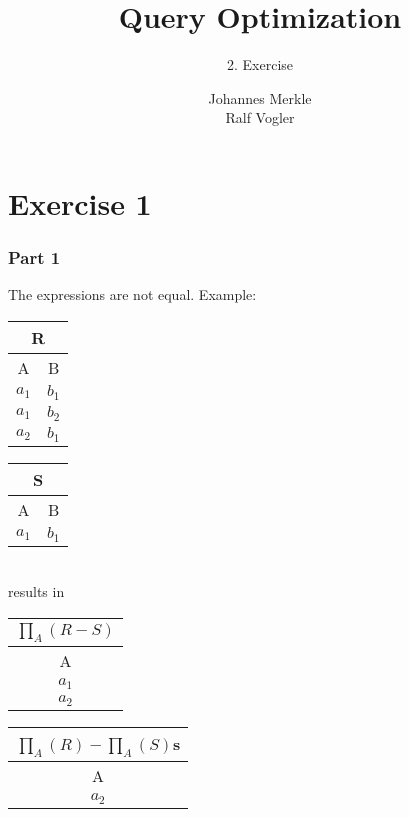 \documentclass[11pt,a4paper]{scrartcl}
\begin{document}
\author{Johannes Merkle\\Ralf Vogler}
\title{Query Optimization}
\subtitle{2. Exercise}

\maketitle

\section*{Exercise 1}

\subsubsection*{Part 1}
The expressions are not equal. Example:\\

\begin{minipage}{.2\textwidth}
\begin{tabular}[t]{|c|c|}
\hline
  \multicolumn{2}{|c|}{R} \\
  \hline
  A & B\\ \hline \hline
  $a_1$ & $b_1$\\
  $a_1$ & $b_2$\\
  $a_2$ & $b_1$\\
  \hline
\end{tabular}
\end{minipage}
\begin{minipage}{.2\textwidth}
\begin{tabular}[t]{|c|c|}
\hline
  \multicolumn{2}{|c|}{S} \\
  \hline
  A & B\\ \hline \hline
  $a_1$ & $b_1$\\
  \hline  
\end{tabular}
\end{minipage}\\

 results in\\

\begin{minipage}{.2\textwidth}
\begin{tabular}{|c|}
\hline
  $\prod_A(R-S)$\\ \hline
  A\\ \hline \hline
  $a_1$\\ \hline
  $a_2$\\
  \hline  
\end{tabular}
\end{minipage}
\begin{minipage}{.2\textwidth}
\begin{tabular}{|c|}
\hline
  $\prod_A(R)-\prod_A(S)$s\\ \hline
  A\\ \hline \hline
  $a_2$\\
  \hline  
\end{tabular}
\end{minipage}\\
\end{document}
